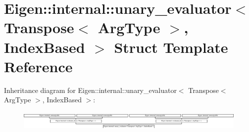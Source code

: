 \hypertarget{struct_eigen_1_1internal_1_1unary__evaluator_3_01_transpose_3_01_arg_type_01_4_00_01_index_based_01_4}{}\section{Eigen\+:\+:internal\+:\+:unary\+\_\+evaluator$<$ Transpose$<$ Arg\+Type $>$, Index\+Based $>$ Struct Template Reference}
\label{struct_eigen_1_1internal_1_1unary__evaluator_3_01_transpose_3_01_arg_type_01_4_00_01_index_based_01_4}
Inheritance diagram for Eigen\+:\+:internal\+:\+:unary\+\_\+evaluator$<$ Transpose$<$ Arg\+Type $>$, Index\+Based $>$\+:\begin{figure}[H]
\begin{center}
\leavevmode
\includegraphics[height=0.979021cm]{struct_eigen_1_1internal_1_1unary__evaluator_3_01_transpose_3_01_arg_type_01_4_00_01_index_based_01_4}
\end{center}
\end{figure}

